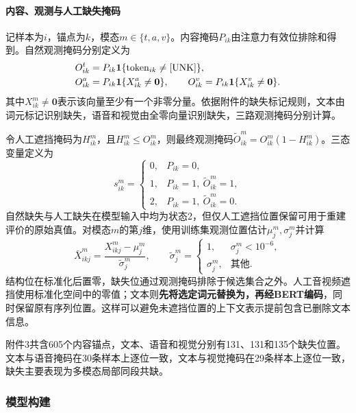 \paragraph{内容、观测与人工缺失掩码}
记样本为$i$，锚点为$k$，模态$m\in\{t,a,v\}$。内容掩码$P_{ik}$由注意力有效位排除\file{[CLS]}和\file{[SEP]}得到。自然观测掩码分别定义为
\begin{align}
 O^t_{ik}&=P_{ik}\mathbf 1\{\mathrm{token}_{ik}\ne[\mathrm{UNK}]\},\\
 O^a_{ik}&=P_{ik}\mathbf 1\{X^a_{ik}\ne\bm0\},\qquad
 O^v_{ik}=P_{ik}\mathbf 1\{X^v_{ik}\ne\bm0\}.
\end{align}
其中$X^m_{ik}\ne\bm0$表示该向量至少有一个非零分量。依据附件的缺失标记规则，文本由词元标记识别缺失，语音和视觉由全零向量识别缺失，三路观测掩码分别计算。

令人工遮挡掩码为$H^m_{ik}$，且$H^m_{ik}\le O^m_{ik}$，则最终观测掩码$\widetilde O^m_{ik}=O^m_{ik}(1-H^m_{ik})$。三态变量定义为
\begin{equation}
s^m_{ik}=\begin{cases}
0,&P_{ik}=0,\\1,&P_{ik}=1,\ \widetilde O^m_{ik}=1,\\2,&P_{ik}=1,\ \widetilde O^m_{ik}=0.
\end{cases}
\end{equation}
自然缺失与人工缺失在模型输入中均为状态2，但仅人工遮挡位置保留可用于重建评价的原始真值。对模态$m$的第$j$维，使用训练集观测位置估计$\mu^m_j,\sigma^m_j$并计算
\begin{equation}
\bar X^m_{ikj}=\frac{X^m_{ikj}-\mu^m_j}{\widetilde\sigma^m_j},\qquad
\widetilde\sigma^m_j=\begin{cases}1,&\sigma^m_j<10^{-6},\\\sigma^m_j,&\text{其他}.
\end{cases}
\end{equation}
结构位在标准化后置零，缺失位通过观测掩码排除于候选集合之外。人工音视频遮挡使用标准化空间中的零值；文本则\textbf{先将选定词元替换为\file{[UNK]}，再经BERT编码}，同时保留原有序列位置。这样可以避免未遮挡位置的上下文表示提前包含已删除文本信息。

附件3共含605个内容锚点，文本、语音和视觉分别有131、131和135个缺失位置。文本与语音掩码在30条样本上逐位一致，文本与视觉掩码在29条样本上逐位一致，缺失主要表现为多模态局部同段共缺。

\subsubsection{模型构建}
